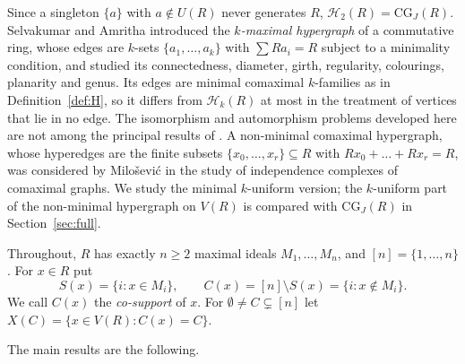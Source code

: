\documentclass{amsart}
\theoremstyle{definition}
\theoremstyle{remark}
\newcommand{\CG}{\mathrm{CG}_J}
\newcommand{\cH}{\mathcal{H}}
\newcommand{\nn}{[n]}
\begin{document}
Since a singleton $\{a\}$ with $a\notin U(R)$ never generates $R$, $\cH_2(R)=\CG(R)$.
Selvakumar and Amritha \cite{SA20,SA19} introduced the \emph{$k$-maximal hypergraph} of a commutative ring, whose edges are $k$-sets $\{a_1,\dots,a_k\}$ with $\sum Ra_i=R$ subject to a minimality condition, and studied its connectedness, diameter, girth, regularity, colourings, planarity and genus. Its edges are minimal comaximal $k$-families as in Definition~\ref{def:H}, so it differs from $\cH_k(R)$ at most in the treatment of vertices that lie in no edge. The isomorphism and automorphism problems developed here are not among the principal results of \cite{SA20,SA19}. A non-minimal comaximal hypergraph, whose hyperedges are the finite subsets $\{x_0,\dots,x_r\}\subseteq R$ with $Rx_0+\dots+Rx_r=R$, was considered by Milo\v{s}evi\'c \cite{Mil15} in the study of independence complexes of comaximal graphs. We study the minimal $k$-uniform version; the $k$-uniform part of the non-minimal hypergraph on $V(R)$ is compared with $\CG(R)$ in Section~\ref{sec:full}.

Throughout, $R$ has exactly $n\ge 2$ maximal ideals $M_1,\dots,M_n$, and $\nn=\{1,\dots,n\}$. For $x\in R$ put
\[
S(x)=\{i: x\in M_i\},\qquad C(x)=\nn\setminus S(x)=\{i: x\notin M_i\}.
\]
We call $C(x)$ the \emph{co-support} of $x$. For $\emptyset\ne C\subsetneq\nn$ let $X(C)=\{x\in V(R): C(x)=C\}$.

The main results are the following.
\end{document}
